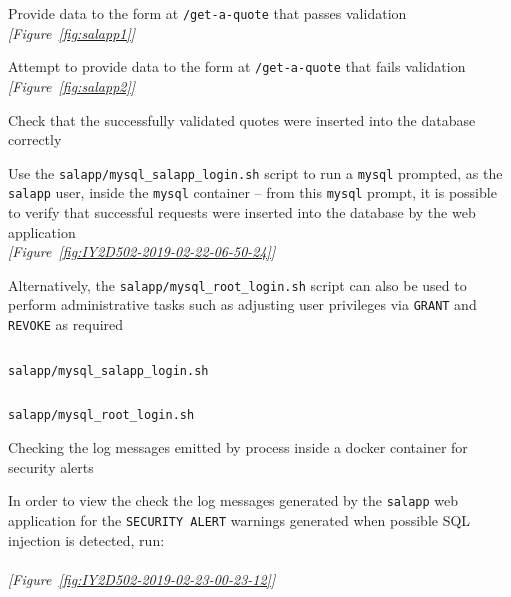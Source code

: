 \begin{methodology0}
    \begin{methodology1}
      \item Provide data to the form at \texttt{/get-a-quote} that passes validation\\
        \textcolor{deep-gray}{\textit{[Figure~\ref{fig:salapp1}]}}
      \item Attempt to provide data to the form at \texttt{/get-a-quote} that fails validation\\
        \textcolor{deep-gray}{\textit{[Figure~\ref{fig:salapp2}]}}
    \end{methodology1}
  \item Check that the successfully validated quotes were inserted into the database correctly
    \begin{methodology1}
      \item Use the \texttt{salapp/mysql\_salapp\_login.sh} script to run a \texttt{mysql} prompted, as the \texttt{salapp} user, inside the \texttt{mysql} container -- from this \texttt{mysql} prompt, it is possible to verify that successful requests were inserted into the database by the web application\\
        \textcolor{deep-gray}{\textit{[Figure~\ref{fig:IY2D502-2019-02-22-06-50-24}]}}
      \item Alternatively, the \texttt{salapp/mysql\_root\_login.sh} script can also be used to perform administrative tasks such as adjusting user privileges via \texttt{GRANT} and \texttt{REVOKE} as required
      \begin{listing}[H]
        \captionsetup{skip=\skiplistingcaptionlen}
        \inputminted[breakanywhere]{bash}{../uswacs-2-iy2d502-salapp/mysql_salapp_login.sh}
        \caption{\texttt{salapp/mysql\_salapp\_login.sh}}
        \label{lst:meth:mysql_salapp_login_sh}
      \end{listing}
      \begin{listing}[H]
        \captionsetup{skip=\skiplistingcaptionlen}
        \inputminted[breakanywhere]{bash}{../uswacs-2-iy2d502-salapp/mysql_root_login.sh}
        \caption{\texttt{salapp/mysql\_root\_login.sh}}
        \label{lst:meth:mysql_root_login_sh}
      \end{listing}
    \end{methodology1}
  \item Checking the log messages emitted by process inside a docker container for security alerts
  \begin{methodology1}
    \item In order to view the check the log messages generated by the \texttt{salapp} web application for the \texttt{SECURITY ALERT} warnings generated when possible SQL injection is detected, run:\\
      \\
      \textcolor{deep-gray}{\textit{[Figure~\ref{fig:IY2D502-2019-02-23-00-23-12}]}}
  \end{methodology1}
\end{methodology0}
